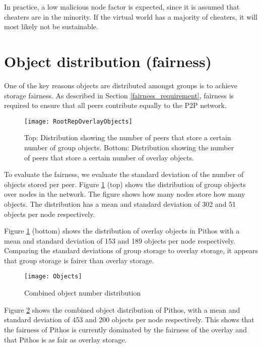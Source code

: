 In practice, a low malicious node factor is expected, since it is assumed that cheaters are in the minority. If the virtual world has a majority of cheaters, it will most likely not be sustainable.

\section{Object distribution (fairness)}

One of the key reasons objects are distributed amongst groups is to achieve storage fairness. As described in Section \ref{fairness_requirement}, fairness is required to ensure that all peers contribute equally to the P2P network.

\begin{figure}[htbp]
 \centering
 \texttt{[image: RootRepOverlayObjects]}
 \caption{Top: Distribution showing the number of peers that store a certain number of group objects. Bottom: Distribution showing the number of peers that store a certain number of overlay objects.}
 \label{fig_group_overlay_objects}
\end{figure}
%
To evaluate the fairness, we evaluate the standard deviation of the number of objects stored per peer. Figure \ref{fig_group_overlay_objects} (top) shows the distribution of group objects over nodes in the network. The figure shows how many nodes store how many objects. The distribution has a mean and standard deviation of 302 and 51 objects per node respectively.

Figure \ref{fig_group_overlay_objects} (bottom) shows the distribution of overlay objects in Pithos with a mean and standard deviation of 153 and 189 objects per node respectively. Comparing the standard deviations of group storage to overlay storage, it appears that group storage is fairer than overlay storage.

\begin{figure}[htbp]
 \centering
 \texttt{[image: Objects]}
 \caption{Combined object number distribution}
 \label{fig_objects}
\end{figure}
%
Figure \ref{fig_objects} shows the combined object distribution of Pithos, with a mean and standard deviation of 453 and 200 objects per node respectively. This shows that the fairness of Pithos is currently dominated by the fairness of the overlay and that Pithos is as fair as overlay storage.

